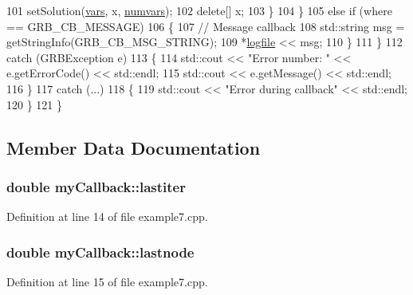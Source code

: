 \begin{DoxyCode}
101             setSolution(\hyperlink{classmyCallback_a5e9e8c33c9ed51920ee430230a91a744}{vars}, x, \hyperlink{classmyCallback_a4093ee09300c254ac977ad61f861f21f}{numvars});
102             \textcolor{keyword}{delete}[] x;
103            \}
104          \} 
105         \textcolor{keywordflow}{else} \textcolor{keywordflow}{if} (where == GRB\_CB\_MESSAGE) 
106          \{
107           \textcolor{comment}{// Message callback}
108           std::string msg = getStringInfo(GRB\_CB\_MSG\_STRING);
109           *\hyperlink{classmyCallback_a6dbb332a87adc69a20b79d9185518adc}{logfile} << msg;
110          \}
111        \}
112       \textcolor{keywordflow}{catch} (GRBException e)
113        \{
114         std::cout << \textcolor{stringliteral}{"Error number: "} << e.getErrorCode() << std::endl;
115         std::cout << e.getMessage() << std::endl;
116        \}
117       \textcolor{keywordflow}{catch} (...) 
118        \{
119         std::cout << \textcolor{stringliteral}{"Error during callback"} << std::endl;
120        \}
121      \}
\end{DoxyCode}


\subsection{Member Data Documentation}
\subsubsection[{\texorpdfstring{lastiter}{lastiter}}]{\setlength{\rightskip}{0pt plus 5cm}double my\+Callback\+::lastiter}\hypertarget{classmyCallback_ab40235875eeddd832320ef2d06205596}{}\label{classmyCallback_ab40235875eeddd832320ef2d06205596}


Definition at line 14 of file example7.\+cpp.

\subsubsection[{\texorpdfstring{lastnode}{lastnode}}]{\setlength{\rightskip}{0pt plus 5cm}double my\+Callback\+::lastnode}\hypertarget{classmyCallback_a87d5f6d39e4319e13798bd57a728863a}{}\label{classmyCallback_a87d5f6d39e4319e13798bd57a728863a}


Definition at line 15 of file example7.\+cpp.

